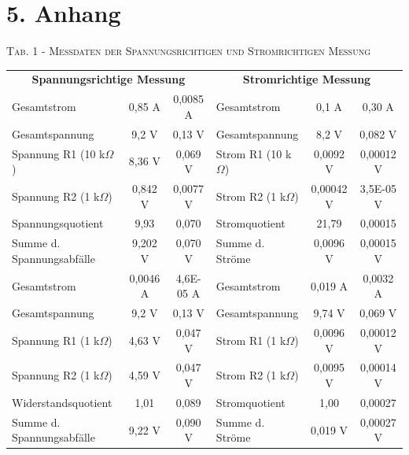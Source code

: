\documentclass[11pt]{article}
\begin{document}
\section*{5. Anhang}
\begin{center}
\textsc{Tab. 1 - Messdaten der Spannungsrichtigen und Stromrichtigen Messung}\\
\vspace{3mm}
\begin{tabular}{lcc|lcc}
\multicolumn{3}{c}{\textbf{Spannungsrichtige Messung}} & \multicolumn{3}{c}{\textbf{Stromrichtige Messung}}\\
Gesamtstrom & 0,85 A & 0,0085 A & Gesamtstrom & 0,1 A & 0,30 A \\
Gesamtspannung & 9,2 V & 0,13 V & Gesamtspannung & 8,2 V & 0,082 V \\
Spannung R1 (10 k$\Omega$) & 8,36 V & 0,069 V & Strom R1 (10 k$\Omega$) & 0,0092 V & 0,00012 V\\
Spannung R2 (1 k$\Omega$) & 0,842 V & 0,0077 V & Strom R2 (1 k$\Omega$) & 0,00042 V & 3,5E-05 V\\
Spannungsquotient & 9,93 & 0,070 & Stromquotient & 21,79 & 0,00015\\
Summe d. Spannungsabfälle & 9,202 V & 0,070 V & Summe d. Ströme & 0,0096 V & 0,00015 V\\
\hline
Gesamtstrom & 0,0046 A & 4,6E-05 A & Gesamtstrom & 0,019 A & 0,0032 A\\
Gesamtspannung & 9,2 V & 0,13 V & Gesamtspannung & 9,74 V & 0,069 V\\
Spannung R1 (1 k$\Omega$) & 4,63 V & 0,047 V & Strom R1 (1 k$\Omega$) & 0,0096 V & 0,00012 V\\
Spannung R2 (1 k$\Omega$) & 4,59 V& 0,047 V & Strom R2 (1 k$\Omega$) & 0,0095 V & 0,00014 V \\
Widerstandsquotient & 1,01 & 0,089 & Stromquotient & 1,00 & 0,00027\\
Summe d. Spannungsabfälle & 9,22 V & 0,090 V & Summe d. Ströme & 0,019 V & 0,00027 V\\
\end{tabular}
\end{center}
\vspace{5mm}
\end{document}

